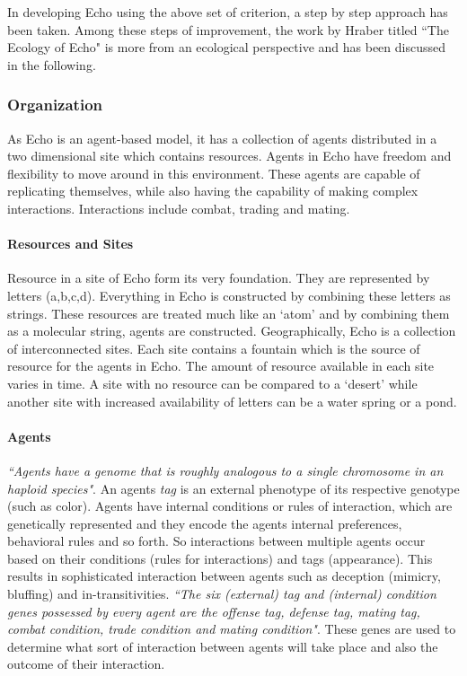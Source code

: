 In developing Echo using the above set of criterion, a step by step approach has been taken. Among these steps of improvement, the work by Hraber titled ``The Ecology of Echo" \cite{hraber1997} is more from an ecological perspective and has been discussed in the following.

\subsubsection{Organization}
As Echo is an agent-based model, it has a collection of agents distributed in a two dimensional site which contains resources. Agents in Echo have freedom and flexibility to move around in this environment. These agents are capable of replicating themselves, while also having the capability of making complex interactions. Interactions include combat, trading and mating.

\paragraph{Resources and Sites}
Resource in a site of Echo form its very foundation. They are represented by letters (a,b,c,d). Everything in Echo is constructed by combining these letters as strings. These resources are treated much like an `atom' and by combining them as a molecular string, agents are constructed. Geographically, Echo is a collection of interconnected sites. Each site contains a fountain which is the source of resource for the agents in Echo. The amount of resource available in each site varies in time. A site with no resource can be compared to a `desert' while another site with increased availability of letters can be a water spring or a pond. 

\paragraph{Agents}
\textsl{``Agents have a genome that is roughly analogous to a single chromosome in an haploid species"}. An agents \textsl{tag} is an external phenotype of its respective genotype (such as color). Agents have internal conditions or rules of interaction, which are genetically represented and they encode the agents internal preferences, behavioral rules and so forth. So interactions between multiple agents occur based on their conditions (rules for interactions) and tags (appearance). This results in sophisticated interaction between agents such as deception (mimicry, bluffing) and in-transitivities. \textsl{``The six (external) tag and (internal) condition genes possessed by every agent are the offense tag, defense tag, mating tag, combat condition, trade condition and mating condition"}. These genes are used to determine what sort of interaction between agents will take place and also the outcome of their interaction. 


